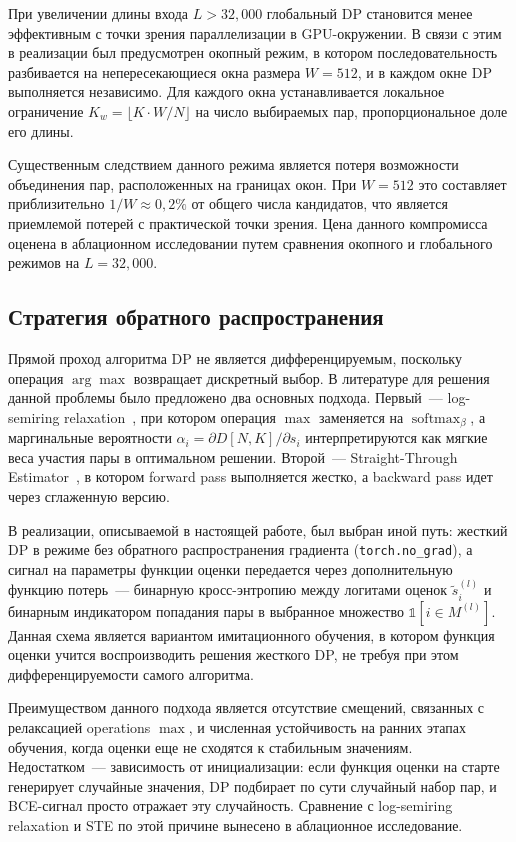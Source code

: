 При увеличении длины входа $L > 32{,}000$ глобальный DP становится
менее эффективным с точки зрения параллелизации в GPU-окружении. В
связи с этим в реализации был предусмотрен окопный режим, в котором
последовательность разбивается на непересекающиеся окна размера $W =
512$, и в каждом окне DP выполняется независимо. Для каждого окна
устанавливается локальное ограничение $K_w = \lfloor K \cdot W / N
\rfloor$ на число выбираемых пар, пропорциональное доле его длины.

Существенным следствием данного режима является потеря возможности
объединения пар, расположенных на границах окон. При $W = 512$ это
составляет приблизительно $1/W \approx 0{,}2\%$ от общего числа
кандидатов, что является приемлемой потерей с практической точки
зрения. Цена данного компромисса оценена в аблационном исследовании
путем сравнения окопного и глобального режимов на $L = 32{,}000$.

\subsection{Стратегия обратного распространения}

Прямой проход алгоритма DP не является дифференцируемым, поскольку
операция $\arg\max$ возвращает дискретный выбор. В литературе для
решения данной проблемы было предложено два основных подхода. Первый~---
log-semiring relaxation~\cite{menschDifferentiableDynamicProgramming2018},
при котором операция $\max$ заменяется на $\operatorname{softmax}_\beta$,
а маргинальные вероятности $\alpha_i = \partial D[N, K] / \partial s_i$
интерпретируются как мягкие веса участия пары в оптимальном решении.
Второй~--- Straight-Through Estimator~\cite{bengioEstimatingPropagatingGradients2013},
в котором forward pass выполняется жестко, а backward pass идет через
сглаженную версию.

В реализации, описываемой в настоящей работе, был выбран иной путь:
жесткий DP в режиме без обратного распространения градиента
(\texttt{torch.no\_grad}), а сигнал на параметры функции оценки
передается через дополнительную функцию потерь~--- бинарную
кросс-энтропию между логитами оценок $\tilde s_i^{(l)}$ и бинарным
индикатором попадания пары в выбранное множество $\mathbb{1}[i \in
M^{(l)}]$. Данная схема является вариантом имитационного обучения, в
котором функция оценки учится воспроизводить решения жесткого DP, не
требуя при этом дифференцируемости самого алгоритма.

Преимуществом данного подхода является отсутствие смещений, связанных
с релаксацией operations $\max$, и численная устойчивость на ранних
этапах обучения, когда оценки еще не сходятся к стабильным значениям.
Недостатком~--- зависимость от инициализации: если функция оценки на
старте генерирует случайные значения, DP подбирает по сути случайный
набор пар, и BCE-сигнал просто отражает эту случайность. Сравнение с
log-semiring relaxation и STE по этой причине вынесено в аблационное
исследование.

